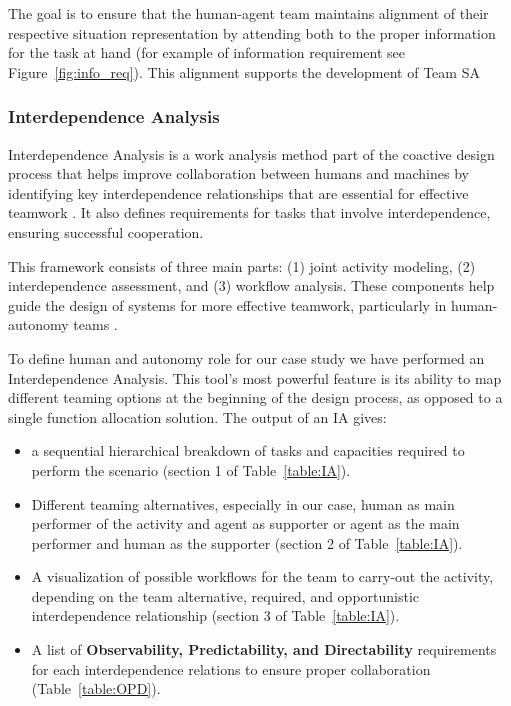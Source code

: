 \documentclass[12pt,a4paper]{article} %
\begin{document}
	The goal is to ensure that the human-agent team maintains alignment of their respective situation representation by attending both to the proper information for the task at hand (for example of information requirement see Figure~\ref{fig:info_req}). This alignment supports the development of Team SA
	
	\subsubsection{Interdependence Analysis}
	Interdependence Analysis is a work analysis method part of the coactive design process that helps improve collaboration between humans and machines by identifying key interdependence relationships that are essential for effective teamwork \parencite{johnson_coactive_2014}. It also defines requirements for tasks that involve interdependence, ensuring successful cooperation. 
	
	This framework consists of three main parts: (1) joint activity modeling, (2) interdependence assessment, and (3) workflow analysis. These components help guide the design of systems for more effective teamwork, particularly in human-autonomy teams \parencite{johnson_understanding_2018}.
	
	To define human and autonomy role for our case study we have performed an Interdependence Analysis. This tool's most powerful feature is its ability to map different teaming options at the beginning of the design process, as opposed to a single function allocation solution. The output of an IA gives:
	\begin{itemize}
		\item a sequential hierarchical breakdown of tasks and capacities required to perform the scenario (section 1 of Table~\ref{table:IA}).
		\item Different teaming alternatives, especially in our case, human as main performer of the activity and agent as supporter or agent as the main performer and human as the supporter (section 2 of Table~\ref{table:IA}).
		\item A visualization of possible workflows for the team to carry-out the activity, depending on the team alternative, required, and opportunistic interdependence relationship (section 3 of Table~\ref{table:IA}).
		\item A list of \textbf{Observability, Predictability, and Directability} requirements for each interdependence relations to ensure proper collaboration (Table~\ref{table:OPD}).
	\end{itemize}
\end{document}

